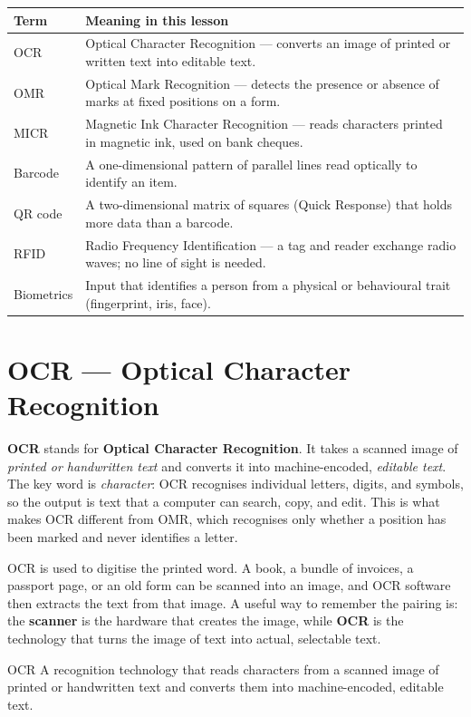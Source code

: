 \begin{center}
\begin{tabular}{p{}p{}}
\toprule
\textbf{Term} & \textbf{Meaning in this lesson} \\
\midrule
OCR & Optical Character Recognition --- converts an image of printed or written text into editable text. \\
OMR & Optical Mark Recognition --- detects the presence or absence of marks at fixed positions on a form. \\
MICR & Magnetic Ink Character Recognition --- reads characters printed in magnetic ink, used on bank cheques. \\
Barcode & A one-dimensional pattern of parallel lines read optically to identify an item. \\
QR code & A two-dimensional matrix of squares (Quick Response) that holds more data than a barcode. \\
RFID & Radio Frequency Identification --- a tag and reader exchange radio waves; no line of sight is needed. \\
Biometrics & Input that identifies a person from a physical or behavioural trait (fingerprint, iris, face). \\
\bottomrule
\end{tabular}
\end{center}

\section{OCR --- Optical Character Recognition}
\textbf{OCR} stands for \textbf{Optical Character Recognition}. It takes a
scanned image of \emph{printed or handwritten text} and converts it into
machine-encoded, \emph{editable text}. The key word is
\emph{character}: OCR recognises individual letters, digits, and symbols, so
the output is text that a computer can search, copy, and edit. This is what
makes OCR different from OMR, which recognises only whether a position has
been marked and never identifies a letter.

OCR is used to digitise the printed word. A book, a bundle of invoices, a
passport page, or an old form can be scanned into an image, and OCR software
then extracts the text from that image. A useful way to remember the pairing
is: the \textbf{scanner} is the hardware that creates the image, while
\textbf{OCR} is the technology that turns the image of text into actual,
selectable text.

\begin{definitionbox}{OCR}
A recognition technology that reads characters from a scanned image of
printed or handwritten text and converts them into machine-encoded,
editable text.
\end{definitionbox}

